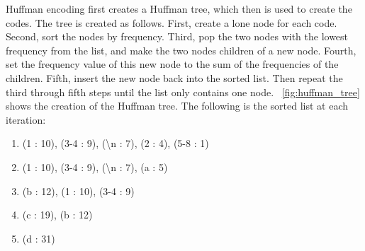 Huffman encoding first creates a Huffman tree, which then is used to create the codes. The tree is created as follows. First, create a lone node for each code. Second, sort the nodes by frequency. Third, pop the two nodes with the lowest frequency from the list, and make the two nodes children of a new node. Fourth, set the frequency value of this new node to the sum of the frequencies of the children. Fifth, insert the new node back into the sorted list. Then repeat the third through fifth steps until the list only contains one node. \figurename~\ref{fig:huffman_tree} shows the creation of the Huffman tree. The following is the sorted list at each iteration:
\begin{enumerate}
    \item (1 : 10), (3-4 : 9), (\textbackslash n : 7), (2 : 4), (5-8 : 1)
    \item (1 : 10), (3-4 : 9), (\textbackslash n : 7), (a : 5)
    \item (b : 12), (1 : 10), (3-4 : 9)
    \item (c : 19), (b : 12)
    \item (d : 31)
\end{enumerate}
